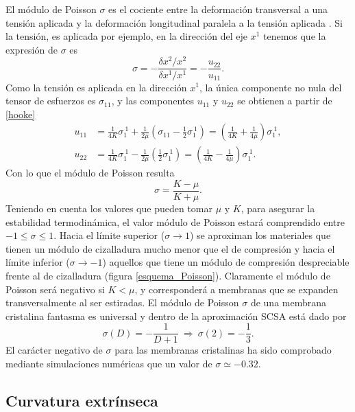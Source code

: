 El módulo de Poisson $\sigma$ es el cociente entre la deformación transversal
a una tensión aplicada y la deformación longitudinal paralela a la tensión
aplicada \cite{Bowick:Libro_superficies}. Si la tensión, es aplicada por
ejemplo, en la dirección del eje $x^1$ tenemos que la expresión de $\sigma$ es
\begin{equation*}
\sigma=-\frac{\delta x^2 / x^2}{\delta x^1 / x^1}=-\frac{u_{22}}{u_{11}}.
\end{equation*}
Como la tensión es aplicada en la dirección $x^1$, la única componente no nula
del tensor de esfuerzos es $\sigma_{11}$, y las componentes $u_{11}$ y $u_{22}$
se obtienen a partir de \eqref{hooke}
\begin{align*}
u_{11}&=\frac{1}{4K}\sigma_1^{\
  1}+\frac{1}{2\mu}\left(\sigma_{11}-\frac{1}{2}\sigma_1^{\
    1}\right)=\left(\frac{1}{4K}+\frac{1}{4\mu}\right)\sigma_1^{\ 1},\\
u_{22}&=\frac{1}{4K}\sigma_1^{\ 1}-\frac{1}{2\mu}\left(\frac{1}{2}\sigma_1^{\
    1}\right)=\left(\frac{1}{4K}-\frac{1}{4\mu}\right)\sigma_1^{\ 1}.
\end{align*}
Con lo que el módulo de Poisson resulta
\begin{equation*}
\sigma=\frac{K-\mu}{K+\mu}.
\end{equation*}
Teniendo en cuenta los valores que pueden tomar $\mu$ y $K$, para asegurar la estabilidad
termodinámica, el valor módulo de Poisson estará comprendido entre $-1\leq \sigma \leq
1$. Hacia el límite superior ($\sigma\rightarrow 1$) se aproximan los materiales que tienen un módulo
de cizalladura mucho menor que el de compresión y hacia el límite inferior ($\sigma\rightarrow -1$)
aquellos que tiene un módulo de compresión despreciable frente al de
cizalladura (figura \ref{esquema_Poisson}). Claramente el módulo de Poisson
será negativo si $K<\mu$, y corresponderá a membranas que se expanden
transversalmente al ser estiradas. El módulo de Poisson $\sigma$ de una
membrana cristalina fantasma es universal \cite{Doussal:nu} y dentro de la aproximación SCSA
está dado por 
\begin{equation*}
\sigma(D)=-\frac{1}{D+1}\ \Rightarrow \ \sigma(2)=-\frac{1}{3}. 
\end{equation*}
El carácter negativo de $\sigma$ para las membranas cristalinas ha sido
comprobado mediante simulaciones numéricas \cite{Bowick_poisson_ratio} que 
 un valor de $\sigma\simeq -0.32$.
\clearpage


\subsection{Curvatura extrínseca}

